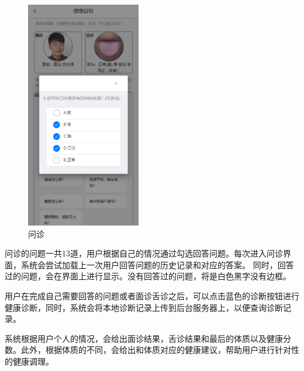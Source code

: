 \begin{figure}
    \centering
    \includegraphics[height=10cm]{images/questions.png}
    \caption{问诊}
    \label{fig:questions}
\end{figure}
问诊的问题一共13道，用户根据自己的情况通过勾选回答问题。每次进入问诊界面，系统会尝试加载上一次用户回答问题的历史记录和对应的答案。
同时，回答过的问题，会在界面上进行显示。没有回答过的问题，将是白色黑字没有边框。

用户在完成自己需要回答的问题或者面诊舌诊之后，可以点击蓝色的诊断按钮进行健康诊断，同时，系统会将本地诊断记录上传到后台服务器上，以便查询诊断记录。

系统根据用户个人的情况，会给出面诊结果，舌诊结果和最后的体质以及健康分数。此外，根据体质的不同，会给出和体质对应的健康建议，帮助用户进行针对性的健康调理。

